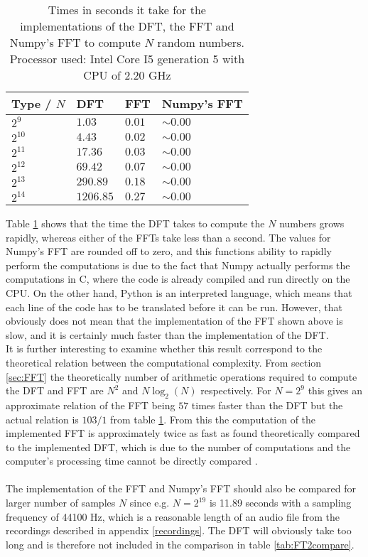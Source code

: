 \begin{table}[H]
\centering
\begin{tabular}{|l|l|l|l|}
\hline
Type / $N$ & DFT	   & FFT 	 & Numpy's FFT \\ \hline
$2^9$  	   & $1.03$    & $0.01$  & $\sim 0.00$ \\ \hline
$2^{10}$   & $4.43$    & $0.02$  & $\sim 0.00$ \\ \hline
$2^{11}$   & $17.36$   & $0.03$  & $\sim 0.00$ \\ \hline
$2^{12}$   & $69.42$   & $0.07$  & $\sim 0.00$ \\ \hline
$2^{13}$   & $290.89$  & $0.18$  & $\sim 0.00$ \\ \hline
$2^{14}$   & $1206.85$ & $0.27$  & $\sim 0.00$ \\ \hline
\end{tabular}
\caption{Times in seconds it take for the implementations of the DFT, the FFT and Numpy's FFT to compute $N$ random numbers. Processor used: Intel Core I5 generation 5 with CPU of 2.20 GHz}
\label{tab:FTcompare}
\end{table}

Table \ref{tab:FTcompare} shows that the time the DFT takes to compute the $N$ numbers grows rapidly, whereas either of the FFTs take less than a second. The values for Numpy's FFT are rounded off to zero, and this functions ability to rapidly perform the computations is due to the fact that Numpy actually performs the computations in C, where the code is already compiled and run directly on the CPU. On the other hand, Python is an interpreted language, which means that each line of the code has to be translated before it can be run. However, that obviously does not mean that the implementation of the FFT shown above is slow, and it is certainly much faster than the implementation of the DFT. \\
It is further interesting to examine whether this result correspond to the theoretical relation between the computational complexity. From section \ref{sec:FFT} the theoretically number of arithmetic operations required to compute the DFT and FFT are $N^2$ and $N\log_2(N)$ respectively.
For $N=2^9$ this gives an approximate relation of the FFT being $57$ times faster than the DFT but the actual relation is $103/1$ from table \ref{tab:FTcompare}. From this the computation of the implemented FFT is approximately twice as fast as found theoretically compared to the implemented DFT, which is due to the number of computations and the computer's processing time cannot be directly compared . \\
\\
The implementation of the FFT and Numpy's FFT should also be compared for larger number of samples $N$ since e.g. $N = 2^{19}$ is 11.89 seconds with a sampling frequency of 44100 Hz, which is a reasonable length of an audio file from the recordings described in appendix \ref{recordings}. The DFT will obviously take too long and is therefore not included in the comparison in table \ref{tab:FT2compare}.

